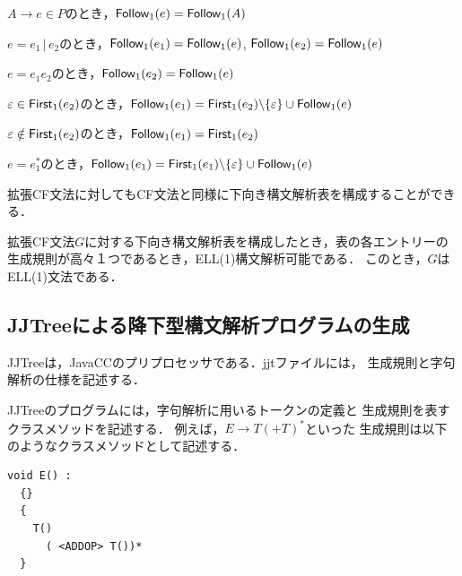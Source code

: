 \documentclass[dvipdfmx,a4j]{jbook}
\begin{document}
\begin{Def}
  $A\rightarrow e\in P$のとき，$\mathsf{Follow}_1({e})=\mathsf{Follow}_1({A})$
  \begin{list}{}{}
    \item $e=e_1\,|\,e_2$のとき，$\mathsf{Follow}_1({e_1})=\mathsf{Follow}_1({e})$, $\mathsf{Follow}_1({e_2})=\mathsf{Follow}_1({e})$
    \item $e=e_1 e_2$のとき，$\mathsf{Follow}_1({e_2})=\mathsf{Follow}_1({e})$
    \begin{list}{}{}
      \item $\varepsilon\in\mathsf{First}_1({e_2})$のとき，$\mathsf{Follow}_1({e_1})=\mathsf{First}_1({e_2})\backslash\{\varepsilon\}\cup\mathsf{Follow}_1({e})$
      \item $\varepsilon\notin\mathsf{First}_1({e_2})$のとき，$\mathsf{Follow}_1({e_1})=\mathsf{First}_1({e_2})$
    \end{list}
    \item $e=e_1^\ast$のとき，$\mathsf{Follow}_1({e_1})=\mathsf{First}_1({e_1})\backslash\{\varepsilon\}\cup\mathsf{Follow}_1({e})$
  \end{list}

\end{Def}

拡張CF文法に対してもCF文法と同様に下向き構文解析表を構成することができる．

\begin{Def}
  拡張CF文法$G$に対する下向き構文解析表を構成したとき，表の各エントリーの
  生成規則が高々１つであるとき，ELL(1)構文解析可能である．
  このとき，$G$はELL(1)文法である．
\end{Def}

\subsection{JJTreeによる降下型構文解析プログラムの生成}

JJTreeは，JavaCCのプリプロセッサである．jjtファイルには，
生成規則と字句解析の仕様を記述する．

JJTreeのプログラムには，字句解析に用いるトークンの定義と
生成規則を表すクラスメソッドを記述する．
例えば，$E\rightarrow T(\texttt{+}T)^\ast$といった
生成規則は以下のようなクラスメソッドとして記述する．

\begin{center}
\begin{minipage}{0.5\textwidth}
\begin{Verbatim}[frame=single]
  void E() :
  {}
  {
    T()
      ( <ADDOP> T())*
  }
\end{Verbatim}
\end{minipage}
\end{center}
\end{document}
